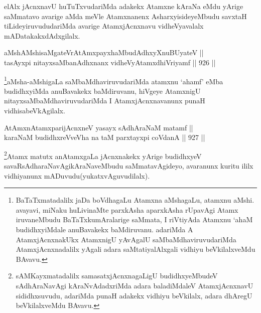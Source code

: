 \begin{artha}
elAlx jAcnxnavU huTuTxvudariMda adakekx Atamxne kAraNa eMdu yArige saMmatavo avarige aMda meVle Atamxnanenx AsharxyisideyeMbudu savxtaH tiLideyiruvududariMda avarige AtamxjAcnxnavu vidheVyavalalx mADatakakxdAdxgilalx.
\end{artha}


\begin{shl}
aMshAMshisaMgateVrAtAmx\s payxhaMbudAdhxyX\s nuBUyateV || \\
tasAyxpi nitayxsaMbanAdhxnanx vidheVyA\s \s tamxdhiVriyamf \hfill || 926 ||  
\end{shl}

\begin{artha}
\footnote{BaTaTxmatadalilx jaDa boVdhagaLu Atamxna aMshagaLu, atamxnu aMshi. avayavi, miNaku huLivinaMte parxkAsha aparxkAsha rUpavAgi Atamx iruvaneMbudu BaTaTxkumAralarige saMmata, I riVtiyAda Atamxnu `ahaM budidhxyiMdale anuBavakekx baMdiruvanu. adariMda A AtamxjAcnxnakUkx AtamxnigU yAvAgalU saMbaMdhaviruvudariMda AtamxjAcnxnadalilx yAgali adara saMtatiyalAlxgali vidhiyu beVkilalxveMdu BAvavu.}aMsha-aMshigaLa saMbaMdhaviruvudariMda atamxnu `ahamf' eMba budidhxyiMda anuBavakekx baMdiruvanu, hiVgeye AtamxnigU nitayxsaMbaMdhaviruvudariMda I AtamxjAcnxnavanunx punaH vidhisabeVkAgilalx.
\end{artha}


\begin{shl}
AtAmxnAtamxparijAcnxneV yasayx sAdhAraNaM matamf || \\
karaNaM budidhxreVveVha na taM parxtayxpi coVdanA \hfill || 927 ||  
\end{shl}

\begin{artha}
\footnote{sAMKayxmatadalilx samasatxjAcnxnagaLigU budidhxyeMbudeV sAdhAraNavAgi kAraNvAdadxriMda adara baladiMdaleV AtamxjAcnxnavU sididhxsuvudu, adariMda punaH adakekx vidhiyu beVkilalx, adara dhAregU beVkilalxveMdu BAvavu.}Atamx matutx anAtamxgaLa jAcnxnakekx yArige budidhxyeV savaRsAdharaNavAgikAraNaveMbudu saMmatavAgideyo, avaranunx kuritu ililx vidhiyanunx mADuvudu(yukatxvAguvudilalx).
\end{artha}


